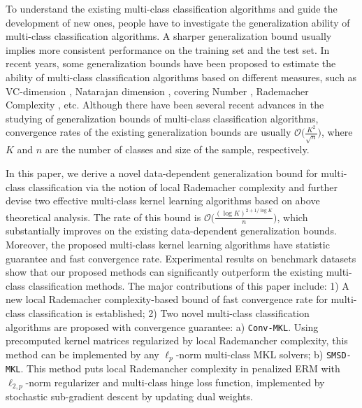 \documentclass{article}
\begin{document}
To understand the existing multi-class classification algorithms and guide the development of new ones,
people have to investigate the generalization ability of multi-class classification algorithms.
A sharper generalization bound usually implies more consistent
performance on the training set and the test set.
In recent years, some generalization bounds have been proposed to
estimate the ability of multi-class classification algorithms based on different measures,
such as
VC-dimension \cite{allwein2000reducing},
Natarajan dimension \cite{daniely2014optimal},
covering Number \cite{guermeur2002combining,zhang2004statistical,Hill2007},
Rademacher Complexity \cite{koltchinskii2002empirical,mohri2012foundations,cortes2013multi}, etc.
Although there have been several recent advances in the studying of
generalization bounds of multi-class classification algorithms,
convergence rates of the existing generalization bounds are usually %
 $\mathcal{O}\big(\frac{K^2}{\sqrt{n}}\big)$,
where $K$ and $n$ are the number of classes and size of the sample, respectively.



In this paper, we derive a novel data-dependent generalization bound for multi-class classification
via the notion of local Rademacher complexity and
further devise two effective multi-class kernel learning algorithms based on above theoretical analysis.
The rate of this bound is $\mathcal{O}\big(\frac{(\log K)^{2+{1}/{\log K}}}{n}\big)$,
which substantially improves on  the existing data-dependent generalization bounds.
Moreover, the proposed multi-class kernel learning algorithms have statistic guarantee and fast convergence rate.
Experimental results on benchmark datasets show that our proposed methods can significantly
outperform the existing multi-class classification methods.
The major contributions of this paper include:
 1) A new local Rademacher complexity-based bound of fast convergence rate for multi-class classification is established;
 2) Two novel multi-class classification algorithms are proposed with convergence guarantee: a) \texttt{Conv-MKL}.
Using precomputed kernel matrices regularized by local Rademancher complexity,
this method can be implemented by any $\ell_p$-norm multi-class MKL solvers;
b) \texttt{SMSD-MKL}.
This method puts local Rademancher complexity
in penalized ERM with $\ell_{2,p}$-norm regularizer and multi-class hinge loss function,
implemented by stochastic sub-gradient descent by updating dual weights.


\end{document}
